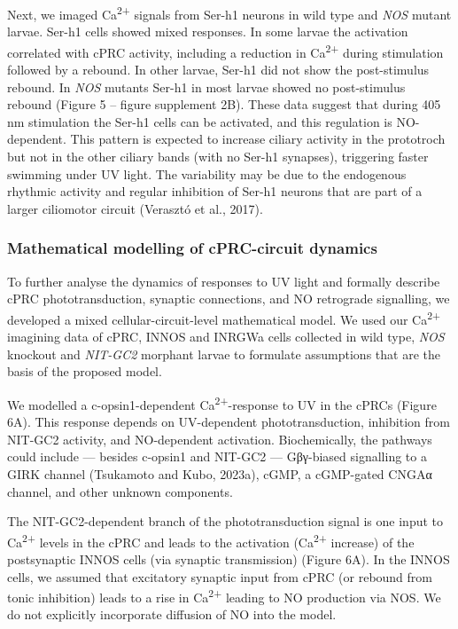 \documentclass[
  11pt,
  letterpaper,
  DIV=11,
  numbers=noendperiod]{scrartcl}
\begin{document}
Next, we imaged Ca\textsuperscript{2+} signals from Ser-h1 neurons in
wild type and \emph{NOS} mutant larvae. Ser-h1 cells showed mixed
responses. In some larvae the activation correlated with cPRC activity,
including a reduction in Ca\textsuperscript{2+} during stimulation
followed by a rebound. In other larvae, Ser-h1 did not show the
post-stimulus rebound. In \emph{NOS} mutants Ser-h1 in most larvae
showed no post-stimulus rebound (Figure 5 -- figure supplement 2B).
These data suggest that during 405 nm stimulation the Ser-h1 cells can
be activated, and this regulation is NO-dependent. This pattern is
expected to increase ciliary activity in the prototroch but not in the
other ciliary bands (with no Ser-h1 synapses), triggering faster
swimming under UV light. The variability may be due to the endogenous
rhythmic activity and regular inhibition of Ser-h1 neurons that are part
of a larger ciliomotor circuit (Verasztó et al., 2017).

\subsubsection{Mathematical modelling of cPRC-circuit
dynamics}\label{mathematical-modelling-of-cprc-circuit-dynamics}

To further analyse the dynamics of responses to UV light and formally
describe cPRC phototransduction, synaptic connections, and NO retrograde
signalling, we developed a mixed cellular-circuit-level mathematical
model. We used our Ca\textsuperscript{2+} imagining data of cPRC, INNOS
and INRGWa cells collected in wild type, \emph{NOS} knockout and
\emph{NIT-GC2} morphant larvae to formulate assumptions that are the
basis of the proposed model.

We modelled a c-opsin1-dependent Ca\textsuperscript{2+}-response to UV
in the cPRCs (Figure 6A). This response depends on UV-dependent
phototransduction, inhibition from NIT-GC2 activity, and NO-dependent
activation. Biochemically, the pathways could include --- besides
c-opsin1 and NIT-GC2 --- Gβγ-biased signalling to a GIRK channel
(Tsukamoto and Kubo, 2023a), cGMP, a cGMP-gated CNGAα channel, and other
unknown components.

The NIT-GC2-dependent branch of the phototransduction signal is one
input to Ca\textsuperscript{2+} levels in the cPRC and leads to the
activation (Ca\textsuperscript{2+} increase) of the postsynaptic INNOS
cells (via synaptic transmission) (Figure 6A). In the INNOS cells, we
assumed that excitatory synaptic input from cPRC (or rebound from tonic
inhibition) leads to a rise in Ca\textsuperscript{2+} leading to NO
production via NOS. We do not explicitly incorporate diffusion of NO
into the model.
\end{document}
